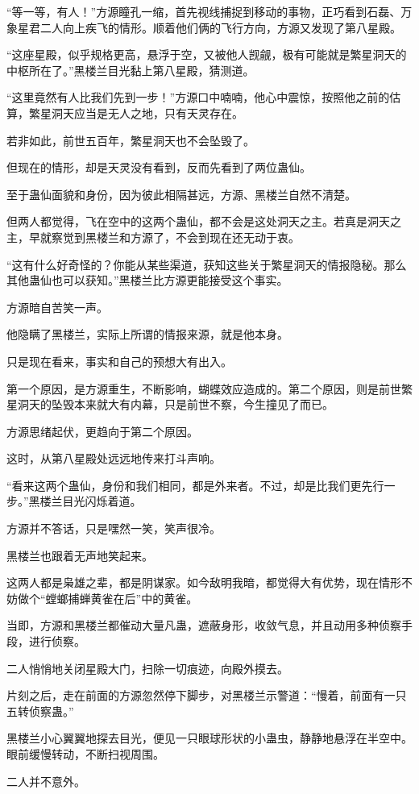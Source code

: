 \begin{this_body}
“等一等，有人！”方源瞳孔一缩，首先视线捕捉到移动的事物，正巧看到石磊、万象星君二人向上疾飞的情形。顺着他们俩的飞行方向，方源又发现了第八星殿。

“这座星殿，似乎规格更高，悬浮于空，又被他人觊觎，极有可能就是繁星洞天的中枢所在了。”黑楼兰目光黏上第八星殿，猜测道。

“这里竟然有人比我们先到一步！”方源口中喃喃，他心中震惊，按照他之前的估算，繁星洞天应当是无人之地，只有天灵存在。

若非如此，前世五百年，繁星洞天也不会坠毁了。

但现在的情形，却是天灵没有看到，反而先看到了两位蛊仙。

至于蛊仙面貌和身份，因为彼此相隔甚远，方源、黑楼兰自然不清楚。

但两人都觉得，飞在空中的这两个蛊仙，都不会是这处洞天之主。若真是洞天之主，早就察觉到黑楼兰和方源了，不会到现在还无动于衷。

“这有什么好奇怪的？你能从某些渠道，获知这些关于繁星洞天的情报隐秘。那么其他蛊仙也可以获知。”黑楼兰比方源更能接受这个事实。

方源暗自苦笑一声。

他隐瞒了黑楼兰，实际上所谓的情报来源，就是他本身。

只是现在看来，事实和自己的预想大有出入。

第一个原因，是方源重生，不断影响，蝴蝶效应造成的。第二个原因，则是前世繁星洞天的坠毁本来就大有内幕，只是前世不察，今生撞见了而已。

方源思绪起伏，更趋向于第二个原因。

这时，从第八星殿处远远地传来打斗声响。

“看来这两个蛊仙，身份和我们相同，都是外来者。不过，却是比我们更先行一步。”黑楼兰目光闪烁着道。

方源并不答话，只是嘿然一笑，笑声很冷。

黑楼兰也跟着无声地笑起来。

这两人都是枭雄之辈，都是阴谋家。如今敌明我暗，都觉得大有优势，现在情形不妨做个“螳螂捕蝉黄雀在后”中的黄雀。

当即，方源和黑楼兰都催动大量凡蛊，遮蔽身形，收敛气息，并且动用多种侦察手段，进行侦察。

二人悄悄地关闭星殿大门，扫除一切痕迹，向殿外摸去。

片刻之后，走在前面的方源忽然停下脚步，对黑楼兰示警道：“慢着，前面有一只五转侦察蛊。”

黑楼兰小心翼翼地探去目光，便见一只眼球形状的小蛊虫，静静地悬浮在半空中。眼前缓慢转动，不断扫视周围。

二人并不意外。


\end{this_body}
